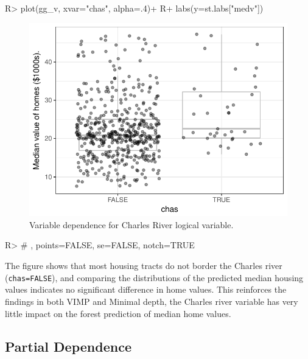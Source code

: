 \documentclass[article]{jss}
\begin{document}
\begin{CodeChunk}

\begin{CodeInput}
R> plot(gg_v, xvar="chas", alpha=.4)+
R+   labs(y=st.labs["medv"])
\end{CodeInput}
\begin{figure}

{\centering \includegraphics{Regression-rfsrc_files/figure-latex/chas-1} 

}

\caption[Variable dependence for Charles River logical variable]{Variable dependence for Charles River logical variable.}\label{fig:chas}
\end{figure}

\begin{CodeInput}
R> # , points=FALSE, se=FALSE, notch=TRUE
\end{CodeInput}
\end{CodeChunk}

The figure shows that most housing tracts do not border the Charles
river (\texttt{chas=FALSE}), and comparing the distributions of the
predicted median housing values indicates no significant difference in
home values. This reinforces the findings in both VIMP and Minimal
depth, the Charles river variable has very little impact on the forest
prediction of median home values.

\subsection{Partial Dependence}\label{partial-dependence}
\end{document}

